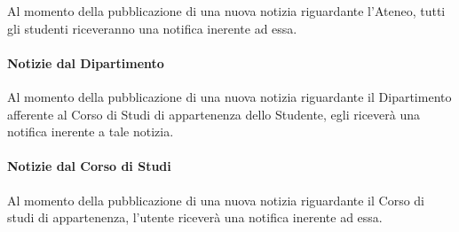 Al momento della pubblicazione di una nuova notizia riguardante l’Ateneo, tutti gli studenti riceveranno una notifica inerente ad essa.

\paragraph{Notizie dal Dipartimento}

Al momento della pubblicazione di una nuova notizia riguardante il Dipartimento afferente al Corso di Studi di appartenenza dello Studente, egli riceverà una notifica inerente a tale notizia.

\paragraph{Notizie dal Corso di Studi}

Al momento della pubblicazione di una nuova notizia riguardante il Corso di studi di appartenenza, l’utente riceverà una notifica inerente ad essa.